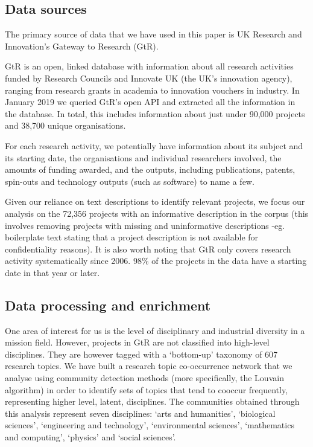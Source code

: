\documentclass[11pt]{article}
\begin{document}
\subsection{Data sources}
\label{subsec:data}

The primary source of data that we have used in this paper is UK Research and Innovation’s Gateway to Research (GtR). 

GtR is an open, linked database with information about all research activities funded by Research Councils and Innovate UK (the UK’s innovation agency), ranging from research grants in academia to innovation vouchers in industry. In January 2019 we queried GtR’s open API and extracted all the information in the database. In total, this includes information about just under 90,000 projects and 38,700 unique organisations.

For each research activity, we potentially have information about its subject and its starting date, the organisations and individual researchers involved, the amounts of funding awarded, and the outputs, including publications, patents, spin-outs and technology outputs (such as software) to name a few.

Given our reliance on text descriptions to identify relevant projects, we focus our analysis on the 72,356 projects with an informative description in the corpus (this involves removing projects with missing and uninformative descriptions -eg. boilerplate text stating that a project description is not available for confidentiality reasons). It is also worth noting that GtR only covers research activity systematically since 2006. 98\% of the projects in the data have a starting date in that year or later.

\subsection{Data processing and enrichment}
One area of interest for us is the level of disciplinary and industrial diversity in a mission field. However, projects in GtR are not classified into high-level disciplines. They are however tagged with a ‘bottom-up’ taxonomy of 607 research topics. We have built a research topic co-occurrence network that we analyse using community detection methods (more specifically, the Louvain algorithm) in order to identify sets of topics that tend to cooccur frequently, representing higher level, latent, disciplines. The communities obtained through this analysis represent seven disciplines: `arts and humanities', `biological sciences', `engineering and technology', `environmental sciences', `mathematics and computing', `physics' and `social sciences'.
\end{document}
